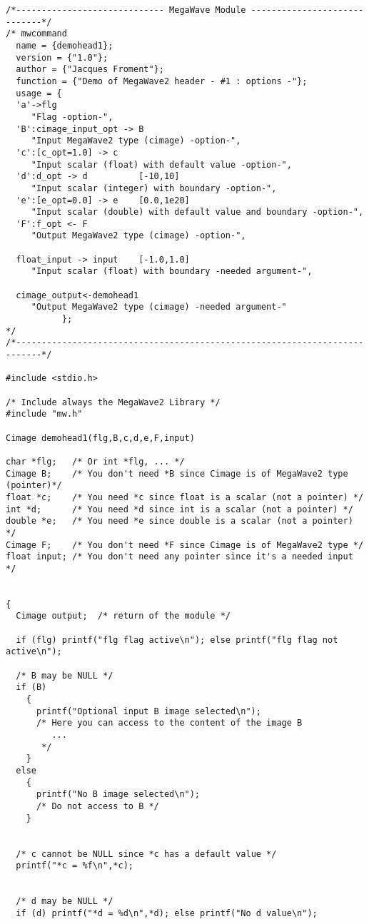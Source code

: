 {\small
\begin{verbatim} 
/*----------------------------- MegaWave Module -----------------------------*/
/* mwcommand
  name = {demohead1};
  version = {"1.0"};
  author = {"Jacques Froment"};
  function = {"Demo of MegaWave2 header - #1 : options -"};
  usage = {
  'a'->flg                   
     "Flag -option-",
  'B':cimage_input_opt -> B
     "Input MegaWave2 type (cimage) -option-", 
  'c':[c_opt=1.0] -> c
     "Input scalar (float) with default value -option-",
  'd':d_opt -> d          [-10,10] 
     "Input scalar (integer) with boundary -option-",
  'e':[e_opt=0.0] -> e    [0.0,1e20] 
     "Input scalar (double) with default value and boundary -option-",
  'F':f_opt <- F
     "Output MegaWave2 type (cimage) -option-",

  float_input -> input    [-1.0,1.0]
     "Input scalar (float) with boundary -needed argument-",

  cimage_output<-demohead1      
     "Output MegaWave2 type (cimage) -needed argument-"
           };
*/
/*---------------------------------------------------------------------------*/

#include <stdio.h>

/* Include always the MegaWave2 Library */
#include "mw.h"

Cimage demohead1(flg,B,c,d,e,F,input)

char *flg;   /* Or int *flg, ... */
Cimage B;    /* You don't need *B since Cimage is of MegaWave2 type (pointer)*/
float *c;    /* You need *c since float is a scalar (not a pointer) */
int *d;      /* You need *d since int is a scalar (not a pointer) */
double *e;   /* You need *e since double is a scalar (not a pointer) */
Cimage F;    /* You don't need *F since Cimage is of MegaWave2 type */
float input; /* You don't need any pointer since it's a needed input */


{
  Cimage output;  /* return of the module */
  
  if (flg) printf("flg flag active\n"); else printf("flg flag not active\n");

  /* B may be NULL */
  if (B) 
    {
      printf("Optional input B image selected\n"); 
      /* Here you can access to the content of the image B
         ...
       */
    }
  else 
    {
      printf("No B image selected\n");
      /* Do not access to B */
    }


  /* c cannot be NULL since *c has a default value */
  printf("*c = %f\n",*c);


  /* d may be NULL */
  if (d) printf("*d = %d\n",*d); else printf("No d value\n");
    

\end{verbatim}}
